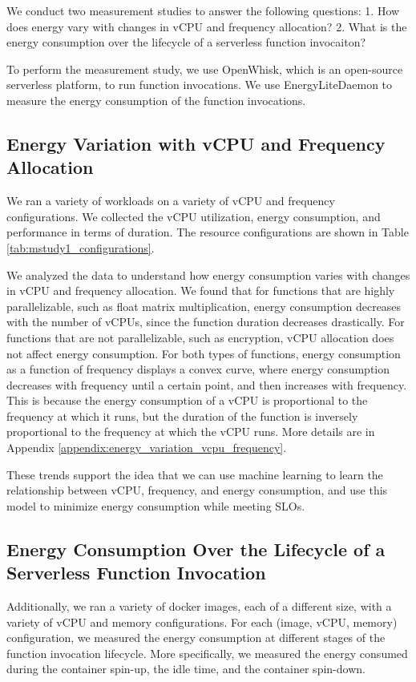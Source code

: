 \documentclass[times, 10pt,twocolumn]{article}
\begin{document}
We conduct two measurement studies to answer the following questions: 1. How does energy vary with changes in vCPU and frequency allocation? 2. What is the energy consumption over the lifecycle of a serverless function invocaiton?

To perform the measurement study, we use OpenWhisk, which is an open-source serverless platform, to run function invocations. We use EnergyLiteDaemon to measure the energy consumption of the function invocations.

\subsection{Energy Variation with vCPU and Frequency Allocation}

We ran a variety of workloads on a variety of vCPU and frequency configurations. We collected the vCPU utilization, energy consumption, and performance in terms of duration. The resource configurations are shown in Table \ref{tab:mstudy1_configurations}.

We analyzed the data to understand how energy consumption varies with changes in vCPU and frequency allocation. We found that for functions that are highly parallelizable, such as float matrix multiplication, energy consumption decreases with the number of vCPUs, since the function duration decreases drastically. For functions that are not parallelizable, such as encryption, vCPU allocation does not affect energy consumption. For both types of functions, energy consumption as a function of frequency displays a convex curve, where energy consumption decreases with frequency until a certain point, and then increases with frequency. This is because the energy consumption of a vCPU is proportional to the frequency at which it runs, but the duration of the function is inversely proportional to the frequency at which the vCPU runs. More details are in Appendix \ref{appendix:energy_variation_vcpu_frequency}.

These trends support the idea that we can use machine learning to learn the relationship between vCPU, frequency, and energy consumption, and use this model to minimize energy consumption while meeting SLOs.

\subsection{Energy Consumption Over the Lifecycle of a Serverless Function Invocation}
Additionally, we ran a variety of docker images, each of a different size, with a variety of vCPU and memory configurations. For each (image, vCPU, memory) configuration, we measured the energy consumption at different stages of the function invocation lifecycle. More specifically, we measured the energy consumed during the container spin-up, the idle time, and the container spin-down.
\end{document}
